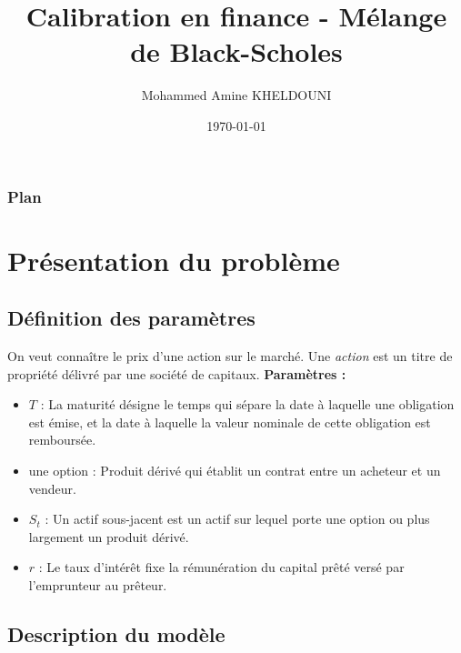 \documentclass{beamer}
\title[Projet MOPSI]{Calibration en finance - Mélange de Black-Scholes} %
\author{Mohammed Amine KHELDOUNI} %
\institute[ENPC] %
{Ecole des Ponts ParisTech \\ %
\medskip
}
\date{\today} %
\begin{document}
\AtBeginSection[]{\frame{\sectionpage}}

\begin{frame}
\titlepage %
\end{frame}

\begin{frame}\frametitle{Plan}
\tableofcontents
\end{frame}

\section{Présentation du problème}
\subsection{Définition des paramètres}

\begin{frame}
On veut connaître le prix d'une action sur le marché. Une \textit{action} est un titre de propriété délivré par une société de capitaux.
\textbf{Paramètres :}
\begin{itemize}
  \item $T$ : La maturité désigne le temps qui sépare la date à laquelle une obligation est émise, et la date à laquelle la valeur nominale de cette obligation est remboursée.
  \item une option :  Produit dérivé qui établit un contrat entre un acheteur et un vendeur.
  \item $S_t$ : Un actif sous-jacent est un actif sur lequel porte une option ou plus largement un produit dérivé.
  \item $r$ : Le taux d'intérêt fixe la rémunération du capital prêté versé par l'emprunteur au prêteur.
\end{itemize}
\end{frame}

\subsection{Description du modèle}

\end{document}

